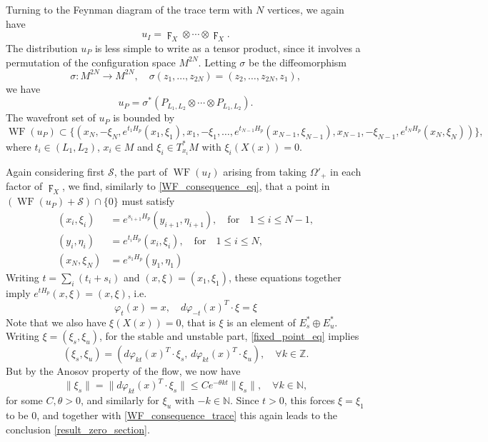 \documentclass[reqno]{amsart}
\theoremstyle{definition}
\theoremstyle{remark}
\renewcommand{\phi}{\varphi}
\newcommand{\N}{\mathbb{N}}
\newcommand{\Z}{\mathbb{Z}}
\DeclareMathOperator{\WF}{WF}
\begin{document}
Turning to the Feynman diagram of the trace term with $N$ vertices, we again have
$$u_I = \digamma_X\otimes\cdots\otimes\digamma_X.$$
The distribution $u_P$ is less simple to write as a tensor product, since it involves a permutation of the configuration space $M^{2N}$. Letting $\sigma$ be the diffeomorphism
$$\sigma: M^{2N}\to M^{2N}, \quad \sigma(z_1,\dots,z_{2N}) = (z_{2},\dots,z_{2N},z_1),$$
we have 
$$u_P = \sigma^*(P_{L_1,L_2}\otimes\cdots\otimes P_{L_1,L_2}).$$
The wavefront set of $u_P$ is bounded by
\begin{equation*}
    \WF(u_P) \subset \{(x_N,-\xi_N,e^{t_1H_p}(x_1,\xi_1),x_1,-\xi_1,\dots,e^{t_{N-1}H_p}(x_{N-1},\xi_{N-1}),x_{N-1},-\xi_{N-1},e^{t_NH_p}(x_N,\xi_N))\},
\end{equation*}
where $t_i\in(L_1,L_2)$, $x_i\in M$ and $\xi_i\in T_{x_i}^*M$ with $\xi_i(X(x))=0$.

Again considering first $\mathcal{S}$, the part of $\WF(u_I)$ arising from taking $\Omega'_+$ in each factor of $\digamma_X$, we find, similarly to \eqref{WF_consequence_eq}, that a point in $(\WF(u_P)+\mathcal{S})\cap\{0\}$ must satisfy
\begin{equation}
\label{WF_consequence_trace}
\begin{split}
    (x_i,\xi_i) &= e^{s_{i+1}H_p}(y_{i+1},\eta_{i+1}), \quad \mathrm{for}\quad 1\le i\le N-1, \\
    (y_i,\eta_i) &= e^{t_{i}H_p}(x_{i},\xi_{i}), \quad \mathrm{for}\quad 1\le i\le N, \\
    (x_N,\xi_N) &= e^{s_{1}H_p}(y_{1},\eta_{1})
\end{split}
\end{equation}
Writing $t=\sum_i (t_i+s_i)$ and $(x,\xi)=(x_1,\xi_1)$, these equations together imply $e^{tH_p}(x,\xi)=(x,\xi)$, i.e.
\begin{equation}
\label{fixed_point_eq}
    \phi_t(x) = x, \quad d\phi_{-t}(x)^T\cdot\xi =\xi
\end{equation}
Note that we also have $\xi(X(x))=0$, that is $\xi$ is an element of $E^*_s \oplus E^*_u$. Writing $\xi = (\xi_s,\xi_u)$, for the stable and unstable part, \eqref{fixed_point_eq} implies
\begin{equation*}
    (\xi_s,\xi_u) = (d\phi_{kt}(x)^T\cdot\xi_s,\, d\phi_{kt}(x)^T\cdot\xi_u), \quad \forall k\in \Z.
\end{equation*}
But by the Anosov property of the flow, we now have
$$\|\xi_s\| = \|d\phi_{kt}(x)^T\cdot\xi_s\| \le Ce^{-\theta kt}\|\xi_s\|, \quad \forall k\in\N,$$
for some $C,\theta >0$, and similarly for $\xi_u$ with $-k\in\N$. Since $t>0$, this forces $\xi=\xi_1$ to be $0$, and together with \eqref{WF_consequence_trace} this again leads to the conclusion \eqref{result_zero_section}.
\end{document}
